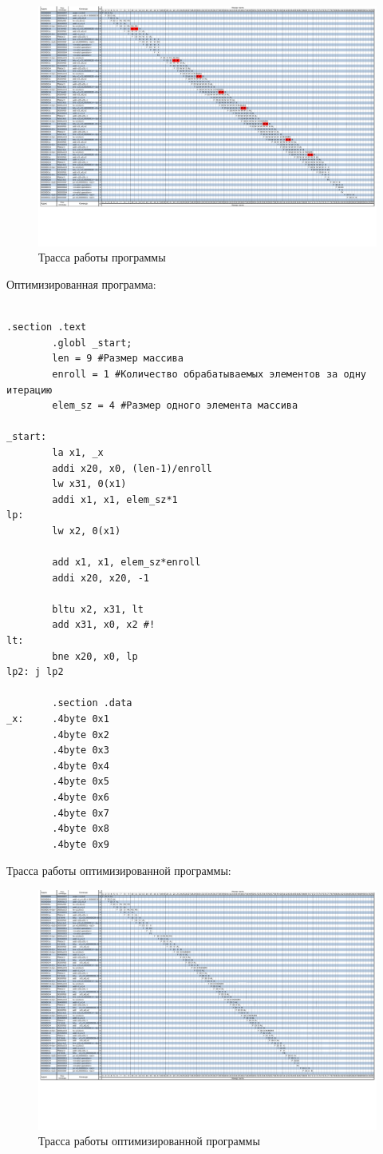 \begin{figure}[ht!]
        \centering
        \includegraphics[width=170mm]{./trassa/default.pdf}
        \caption{Трасса работы программы\label{overflow7}}
    \end{figure}

Оптимизированная программа:
\begin{lstlisting}

.section .text
        .globl _start;
        len = 9 #Размер массива
        enroll = 1 #Количество обрабатываемых элементов за одну итерацию
        elem_sz = 4 #Размер одного элемента массива

_start:
        la x1, _x
        addi x20, x0, (len-1)/enroll
        lw x31, 0(x1)
        addi x1, x1, elem_sz*1
lp:
        lw x2, 0(x1)
        
        add x1, x1, elem_sz*enroll
        addi x20, x20, -1

        bltu x2, x31, lt
        add x31, x0, x2 #!
lt:
        bne x20, x0, lp
lp2: j lp2

        .section .data
_x:     .4byte 0x1
        .4byte 0x2
        .4byte 0x3
        .4byte 0x4
        .4byte 0x5
        .4byte 0x6
        .4byte 0x7
        .4byte 0x8
        .4byte 0x9

\end{lstlisting}

Трасса работы оптимизированной программы:
\begin{figure}[ht!]
    \centering
    \includegraphics[width=170mm]{./trassa/opt.pdf}
    \caption{Трасса работы оптимизированной программы\label{overflow8}}
\end{figure}